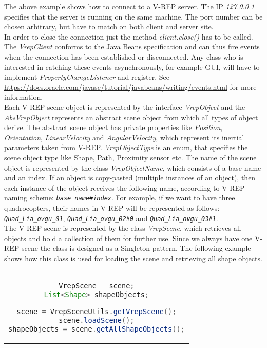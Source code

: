 The above example shows how to connect to a V-REP server. The IP \textit{127.0.0.1} specifies that the server is running on the same machine. The port number can be chosen arbitrary, but have to match on both client and server site.\\
In order to close the connection just the method \textit{client.close()} has to be called. \\

The \textit{VrepClient} conforms to the Java Beans specification and can thus fire events when the connection has been established or disconnected. Any class who is interested in catching these events asynchronously, for example \gls{GUI}, will have to implement \textit{PropertyChangeListener} and register. See
\url{https://docs.oracle.com/javase/tutorial/javabeans/writing/events.html} for more information. \\

Each V-REP scene object is represented by the interface \textit{VrepObject} and the \textit{AbsVrepObject} represents an abstract scene object from which all types of object derive. The abstract scene object has private properties like \textit{Position}, \textit{Orientation}, \textit{LinearVelocity} and \textit{AngularVelocity}, which represent its inertial parameters taken from  V-REP.
\textit{VrepObjectType} is an enum, that specifies the scene object type like Shape, Path, Proximity sensor etc. 
The name of the scene object is represented by the class \textit{VrepObjectName}, which consists of a base name and an index. If an object is copy-pasted (multiple instances of an object), then each instance of the object receives the following name, according to V-REP naming scheme: \textit{\texttt{base\_name\#index}}. 
For example, if we want to have three quadrocopters, their names in V-REP will be represented as follows: \textit{\texttt{Quad\_Lia\_ovgu\_01}}, \textit{\texttt{Quad\_Lia\_ovgu\_02\#0}} and \textit{\texttt{Quad\_Lia\_ovgu\_03\#1}}. \\

The V-REP scene is represented by the class \textit{VrepScene}, which retrieves all objects and hold a collection of them for further use. Since we always have one V-REP scene the class is designed as a Singleton pattern. The following example shows how this class is used for loading the scene and retrieving all shape objects.

\begin{center}
\begin{tabular}{c}
\begin{lstlisting}[basicstyle=\small, language=Java, caption={Retrieve V-REP scene objects}]
VrepScene   scene;
List<Shape> shapeObjects;

scene = VrepSceneUtils.getVrepScene();
scene.loadScene();
shapeObjects = scene.getAllShapeObjects();

\end{lstlisting}
\end{tabular}
\end{center}

